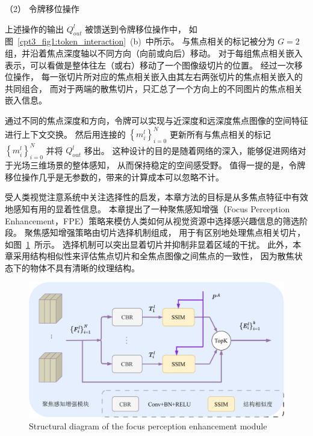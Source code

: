 （2）
令牌移位操作




上述操作的输出 $ Q_{out}^{l} $ 被馈送到令牌移位操作中，
如图~\ref{cpt3_fig1:token_interaction}~(b)~中所示。 
与焦点相关的标记被分为 $G = 2$ 组，并沿着焦点深度轴以不同方向（向前或向后）移动。 
对于每组焦点相关嵌入表示，可以看做是整体往左（或右）移动了一个图像级切片的位置。
经过一次移位操作，
每一张切片所对应的焦点相关嵌入由其左右两张切片的焦点相关嵌入的共同组合，
而对于两端的散焦切片，只汇总了一个方向上的不同图片的焦点相关嵌入信息。




通过不同的焦点深度和方向，令牌可以实现与近深度和远深度焦点图像的空间特征进行上下文交换。 
然后用连接的 $ \left \{ m_{i}^{l} \right \}_{i=0}^{N} $ 更新所有与焦点相关的标记  $ \left \{ m_{i}^{l} \right \}_{i=0}^{N} $ 并将 
$ Q_{out}^{l} $ 移出。 
%
%
%
%
%
%
这种设计的目的是随着网络的深入，能够促进网络对于光场三维场景的整体感知，
从而保持稳定的空间感受野。 
值得一提的是，令牌移位操作几乎是无参数的，带来的计算成本可以忽略不计。










受人类视觉注意系统中关注选择性的启发，本章方法的目标是从多焦点特征中有效地感知有用的显着性信息。 
本章提出了一种聚焦感知增强（Focus Perception Enhancement，FPE）策略来模仿人类如何从视觉资源中选择感兴趣信息的筛选阶段。 
聚焦感知增强策略由切片选择机制组成，
用于有区别地处理焦点相关切片，
如图~\ref{cpt3_fig1:fpe}~所示。
选择机制可以突出显着切片并抑制非显着区域的干扰。 
此外，本章采用结构相似性来评估焦点切片和全焦点图像之间焦点的一致性，
因为散焦状态下的物体不具有清晰的纹理结构。 



\begin{figure}[!ht]
	\centering
	\includegraphics[width=0.90\linewidth]{figures/chapter3/fpe}
	{Structural diagram of the focus perception enhancement module}
	\label{cpt3_fig1:fpe}
\end{figure}



